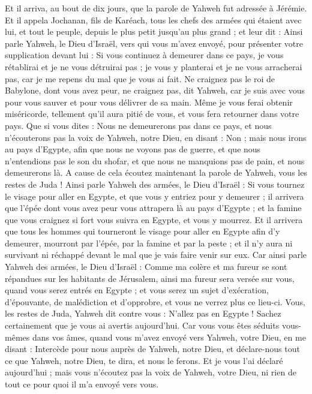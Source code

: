 \begin{multicols}{2}
Et il arriva, au bout de dix jours, que la parole de Yahweh fut adressée à Jérémie.
Et il appela Jochanan, fils de Karéach, tous les chefs des armées qui étaient avec lui, et tout le peuple, depuis le plus petit jusqu'au plus grand ;
et leur dit : Ainsi parle Yahweh, le Dieu d'Israël, vers qui vous m'avez envoyé, pour présenter votre supplication devant lui :
Si vous continuez à demeurer dans ce pays, je vous rétablirai et je ne vous détruirai pas ; je vous y planterai et je ne vous arracherai pas, car je me repens du mal que je vous ai fait.
Ne craignez pas le roi de Babylone, dont vous avez peur, ne craignez pas, dit Yahweh, car je suis avec vous pour vous sauver et pour vous délivrer de sa main.
Même je vous ferai obtenir miséricorde, tellement qu'il aura pitié de vous, et vous fera retourner dans votre pays.
Que si vous dites : Nous ne demeurerons pas dans ce pays, et nous n'écouterons pas la voix de Yahweh, notre Dieu,
en disant : Non ; mais nous irons au pays d'Egypte, afin que nous ne voyons pas de guerre, et que nous n'entendions pas le son du shofar, et que nous ne manquions pas de pain, et nous demeurerons là.
A cause de cela écoutez maintenant la parole de Yahweh, vous les restes de Juda ! Ainsi parle Yahweh des armées, le Dieu d'Israël : Si vous tournez le visage pour aller en Egypte, et que vous y entriez pour y demeurer ;
il arrivera que l'épée dont vous avez peur vous attrapera là au pays d'Egypte ; et la famine que vous craignez si fort vous suivra en Egypte, et vous y mourrez.
Et il arrivera que tous les hommes qui tourneront le visage pour aller en Egypte afin d'y demeurer, mourront par l'épée, par la famine et par la peste ; et il n'y aura ni survivant ni réchappé devant le mal que je vais faire venir sur eux.
Car ainsi parle Yahweh des armées, le Dieu d'Israël : Comme ma colère et ma fureur se sont répandues sur les habitants de Jérusalem, ainsi ma fureur sera versée sur vous, quand vous serez entrés en Egypte ; et vous serez un sujet d'exécration, d'épouvante, de malédiction et d'opprobre, et vous ne verrez plus ce lieu-ci.
Vous, les restes de Juda, Yahweh dit contre vous : N'allez pas en Egypte ! Sachez certainement que je vous ai avertis aujourd'hui.
Car vous vous êtes séduits vous-mêmes dans vos âmes, quand vous m'avez envoyé vers Yahweh, votre Dieu, en me disant : Intercède pour nous auprès de Yahweh, notre Dieu, et déclare-nous tout ce que Yahweh, notre Dieu, te dira, et nous le ferons.
Et je vous l'ai déclaré aujourd'hui ; mais vous n'écoutez pas la voix de Yahweh, votre Dieu, ni rien de tout ce pour quoi il m'a envoyé vers vous.

\end{multicols}
